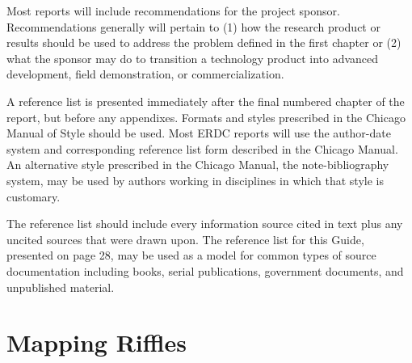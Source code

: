 \documentclass[]{book}
\theoremstyle{definition}
\theoremstyle{definition}
\theoremstyle{definition}
\theoremstyle{remark}
\begin{document}
Most reports will include recommendations for the project sponsor.
Recommendations generally will pertain to (1) how the research product
or results should be used to address the problem defined in the first
chapter or (2) what the sponsor may do to transition a technology
product into advanced development, field demonstration, or
commercialization.

A reference list is presented immediately after the final numbered
chapter of the report, but before any appendixes. Formats and styles
prescribed in the Chicago Manual of Style should be used. Most ERDC
reports will use the author-date system and corresponding reference list
form described in the Chicago Manual. An alternative style prescribed in
the Chicago Manual, the note-bibliography system, may be used by authors
working in disciplines in which that style is customary.

The reference list should include every information source cited in text
plus any uncited sources that were drawn upon. The reference list for
this Guide, presented on page 28, may be used as a model for common
types of source documentation including books, serial publications,
government documents, and unpublished material.

\chapter*{Mapping Riffles}\label{mapping-riffles}


\end{document}
